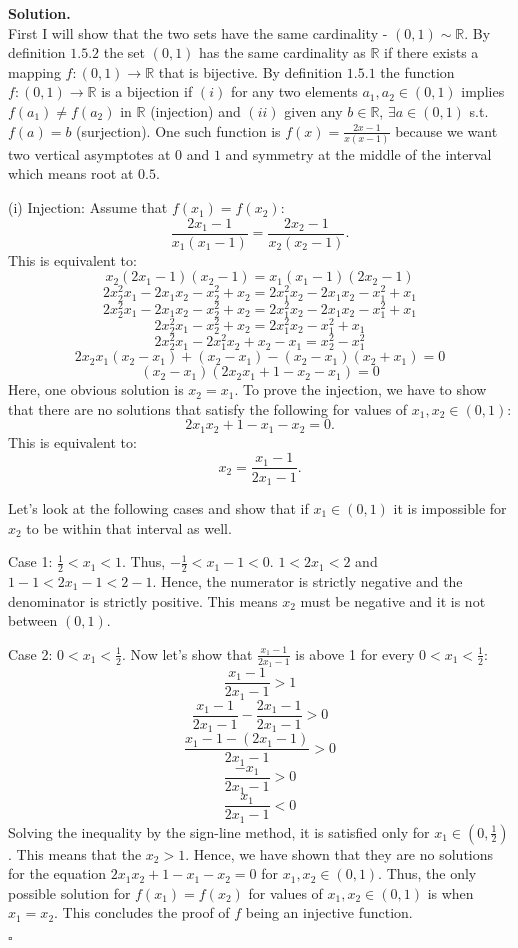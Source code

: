 \documentclass[12pt]{article}
\theoremstyle{definition}
\theoremstyle{remark}
\newenvironment{solution}{
    \noindent
    \textbf{Solution.}\\
}{
    \quad \hfill $\square$
    \vspace{1em}
}
\begin{document}
\begin{solution}
    First I will show that the two sets have the same cardinality - $(0, 1) \sim \mathbb{R}$. By definition $1.5.2$ \cite{abbott2015understanding} the set $(0, 1)$ has the same cardinality as $\mathbb{R}$ if there exists a mapping $f:(0, 1) \rightarrow{\mathbb{R}} $ that is bijective. By definition $1.5.1$ \cite{abbott2015understanding} the function $f:(0, 1) \rightarrow{\mathbb{R}} $ is a bijection if $(i)$ for any two elements $a_1, a_2 \in (0, 1)$ implies $f(a_1) \neq f(a_2)$ in $\mathbb{R}$ (injection) and $(ii)$ given any $b \in \mathbb{R}$, $\exists a \in (0, 1)$ s.t. $f(a)=b$ (surjection). One such function is $f(x) = \frac{2x-1}{x(x-1)}$ because we want two vertical asymptotes at $0$ and $1$ and symmetry at the middle of the interval which means root at $0.5$. %
    
    (i) Injection: 
    Assume that $f(x_1)=f(x_2)$:
    $$\frac{2x_1-1}{x_1(x_1-1)} = \frac{2x_2-1}{x_2(x_2-1)}.$$
        This is equivalent to:
    $$x_2(2x_1-1)(x_2-1) = x_1(x_1-1)(2x_2-1)$$
    $$2x_2^2x_1-2x_1x_2 -x_2^2+x_2= 2x_1^2x_2-2x_1x_2 -x_1^2+x_1$$
    $$2x_2^2x_1-2x_1x_2 -x_2^2+x_2= 2x_1^2x_2-2x_1x_2 -x_1^2+x_1$$
    $$2x_2^2x_1-x_2^2+x_2= 2x_1^2x_2-x_1^2+x_1$$
    $$2x_2^2x_1 - 2x_1^2x_2 +x_2 - x_1 =  x_2^2-x_1^2$$
    $$2x_2x_1(x_2 - x_1) +(x_2 - x_1) - (x_2-x_1)(x_2+x_1)= 0$$
    $$(x_2 - x_1)(2x_2x_1 +1 - x_2 - x_1)= 0$$
    Here, one obvious solution is $x_2=x_1$. To prove the injection, we have to show that there are no solutions that satisfy the following for values of $x_1, x_2 \in (0, 1)$:
    $$2x_1x_2 +1 - x_1 - x_2= 0.$$
    This is equivalent to: 
    $$x_2 = \frac{x_1-1}{2x_1-1}.$$
    
    Let's look at the following cases and show that if $x_1 \in(0,1)$ it is impossible for $x_2$ to be within that interval as well.
    
    Case 1: $\frac{1}{2}<x_1<1$. Thus, $-\frac{1}{2}<x_1-1<0$. $1<2x_1<2$ and $1-1<2x_1-1<2-1$. Hence, the numerator is strictly negative and the denominator is strictly positive. This means $x_2$ must be negative and it is not between $(0, 1)$. 
    
    Case 2: $0<x_1<\frac{1}{2}$. Now let's show that $\frac{x_1-1}{2x_1-1}$ is above 1 for every $0<x_1<\frac{1}{2}$:
    $$\frac{x_1-1}{2x_1-1} > 1$$
    $$\frac{x_1-1}{2x_1-1} - \frac{2x_1-1}{2x_1-1}> 0 $$
    $$\frac{x_1-1 - (2x_1-1)}{2x_1-1}> 0 $$
    $$\frac{-x_1}{2x_1-1}> 0 $$ 
    $$\frac{x_1}{2x_1-1}< 0 $$ 
    Solving the inequality by the sign-line method, it is satisfied only for $x_1 \in (0, \frac{1}{2})$. This means that the $x_2 >1$. 
    Hence, we have shown that they are no solutions for the equation $2x_1x_2 +1 - x_1 - x_2= 0$ for $x_1, x_2 \in (0, 1)$. Thus, the only possible solution for $f(x_1) = f(x_2)$ for values of $x_1, x_2 \in (0, 1)$ is when $x_1=x_2$. This concludes the proof of $f$ being an injective function. 
        

\end{solution}
\end{document}
